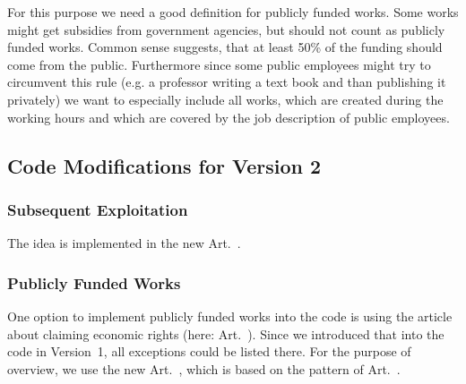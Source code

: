For this purpose we need a good definition for publicly funded works. Some works might get subsidies from government agencies, but should not count as publicly funded works. Common sense suggests, that at least 50\% of the funding should come from the public. Furthermore since some public employees might try to circumvent this rule (e.g. a professor writing a text book and than publishing it privately) we want to especially include all works, which are created during the working hours and which are covered by the job description of public employees.

\subsection{Code Modifications for Version 2}

\subsubsection{Subsequent Exploitation}

The idea is implemented in the new Art.~.

\subsubsection{Publicly Funded Works}

One option to implement publicly funded works into the code is using the article about claiming economic rights (here: Art.~). Since we introduced that into the code in Version~1, all exceptions could be listed there. For the purpose of overview, we use the new Art.~, which is based on the pattern of Art.~.